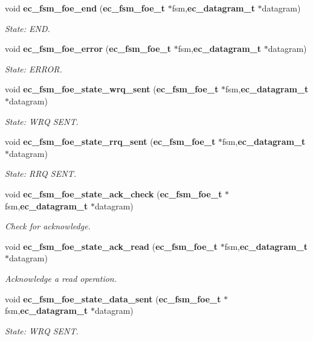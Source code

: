 \begin{DoxyCompactItemize}
void {\bf ec\-\_\-fsm\-\_\-foe\-\_\-end} ({\bf ec\-\_\-fsm\-\_\-foe\-\_\-t} $\ast$fsm,{\bf ec\-\_\-datagram\-\_\-t} $\ast$datagram)
\begin{DoxyCompactList}\small\item\em \-State\-: \-E\-N\-D. \end{DoxyCompactList}\item 
void {\bf ec\-\_\-fsm\-\_\-foe\-\_\-error} ({\bf ec\-\_\-fsm\-\_\-foe\-\_\-t} $\ast$fsm,{\bf ec\-\_\-datagram\-\_\-t} $\ast$datagram)
\begin{DoxyCompactList}\small\item\em \-State\-: \-E\-R\-R\-O\-R. \end{DoxyCompactList}\item 
void {\bf ec\-\_\-fsm\-\_\-foe\-\_\-state\-\_\-wrq\-\_\-sent} ({\bf ec\-\_\-fsm\-\_\-foe\-\_\-t} $\ast$fsm,{\bf ec\-\_\-datagram\-\_\-t} $\ast$datagram)
\begin{DoxyCompactList}\small\item\em \-State\-: \-W\-R\-Q \-S\-E\-N\-T. \end{DoxyCompactList}\item 
void {\bf ec\-\_\-fsm\-\_\-foe\-\_\-state\-\_\-rrq\-\_\-sent} ({\bf ec\-\_\-fsm\-\_\-foe\-\_\-t} $\ast$fsm,{\bf ec\-\_\-datagram\-\_\-t} $\ast$datagram)
\begin{DoxyCompactList}\small\item\em \-State\-: \-R\-R\-Q \-S\-E\-N\-T. \end{DoxyCompactList}\item 
void {\bf ec\-\_\-fsm\-\_\-foe\-\_\-state\-\_\-ack\-\_\-check} ({\bf ec\-\_\-fsm\-\_\-foe\-\_\-t} $\ast$fsm,{\bf ec\-\_\-datagram\-\_\-t} $\ast$datagram)
\begin{DoxyCompactList}\small\item\em \-Check for acknowledge. \end{DoxyCompactList}\item 
void {\bf ec\-\_\-fsm\-\_\-foe\-\_\-state\-\_\-ack\-\_\-read} ({\bf ec\-\_\-fsm\-\_\-foe\-\_\-t} $\ast$fsm,{\bf ec\-\_\-datagram\-\_\-t} $\ast$datagram)
\begin{DoxyCompactList}\small\item\em \-Acknowledge a read operation. \end{DoxyCompactList}\item 
void {\bf ec\-\_\-fsm\-\_\-foe\-\_\-state\-\_\-data\-\_\-sent} ({\bf ec\-\_\-fsm\-\_\-foe\-\_\-t} $\ast$fsm,{\bf ec\-\_\-datagram\-\_\-t} $\ast$datagram)
\begin{DoxyCompactList}\small\item\em \-State\-: \-W\-R\-Q \-S\-E\-N\-T. \end{DoxyCompactList}\item 

\end{DoxyCompactItemize}
